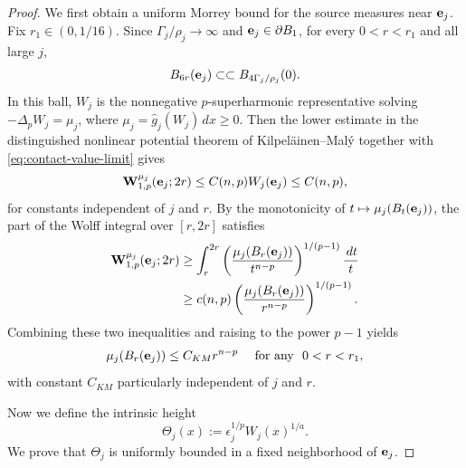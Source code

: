 \documentclass[reqno,12pt]{amsart}
\numberwithin{equation}{section}
\theoremstyle{remark}
\newcommand{\dd}{\,d}
\newcommand{\Wolff}{\mathbf W}
\begin{document}
\begin{proof}
\medskip
{}
We first obtain a uniform Morrey bound for the source measures near
${\bf e}_j$.  Fix $r_1\in(0,1/16)$.  Since $\Gamma_j/\rho_j\to\infty$ and ${\bf e}_j\in\partial B_1$, for every $0<r<r_1$ and all large $j$,
$$
B_{6r}({\bf e}_j)\subset\subset B_{4\Gamma_j/\rho_j}(0).
$$
In this ball, $W_j$ is the nonnegative $p$-superharmonic representative solving
$-\Delta_pW_j=\mu_j$, where $\mu_j=\widehat g_j(W_j)\dd x\ge0$.  Then the lower estimate in the distinguished nonlinear potential theorem of Kilpel\"ainen--Mal\'y \cite[Theorem~1.6]{KM1994} together with \eqref{eq:contact-value-limit} gives
$$
\Wolff_{1,p}^{\mu_j}({\bf e}_j;2r) \le C(n, p) W_j({\bf e}_j) \le C(n, p) ,
$$
for constants independent of $j$ and $r$.  By the monotonicity of $t\mapsto\mu_j(B_t({\bf e}_j))$, the part of the Wolff integral over $[r,2r]$ satisfies
$$
\begin{aligned}
 \Wolff_{1,p}^{\mu_j}({\bf e}_j;2r)
 &\ge\int_r^{2r} \left(\frac{\mu_j(B_r({\bf e}_j))}{t^{n-p}}\right)^{1/(p-1)} \frac{\dd t}{t}\\
 &\ge c(n,p) \left(\frac{\mu_j(B_r({\bf e}_j))}{r^{n-p}}\right)^{1/(p-1)}.
\end{aligned}
$$
Combining these two inequalities and raising to the power $p-1$ yields
\begin{equation}\label{eq:contact-Morrey}
\mu_j(B_r({\bf e}_j))\le C_{KM} r^{n-p} \quad \text{ for any } \ 0<r<r_1,
\end{equation}
with constant $C_{KM}$ particularly independent of $j$ and $r$.

Now we define the  intrinsic height
\begin{equation}\label{eq:defn-Thetaj}
\Theta_j(x):=\epsilon_j^{1/p}W_j(x)^{1/a}.
\end{equation}
We prove that $\Theta_j$ is uniformly bounded in a fixed neighborhood of ${\bf e}_j$.   


\end{proof}
\end{document}
